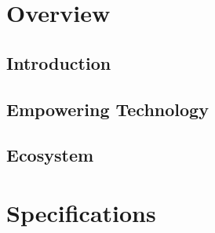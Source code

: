 \documentclass[12pt,fleqn]{book} %
\begin{document}

\pagestyle{empty} %

\tableofcontents %

\cleardoublepage %

\pagestyle{fancy} %

\part{Overview}



\chapter{Introduction}


\chapter{Empowering Technology}


\chapter{Ecosystem}



\part{Specifications}\label{part:specifications}

\end{document}
